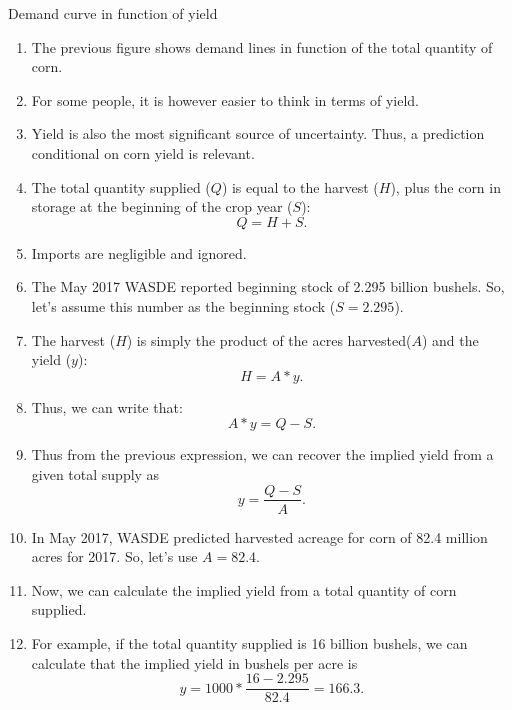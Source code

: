 \documentclass[table,xcolor=pdftex,dvipsnames, handout]{beamer}\usepackage[]{graphicx}\usepackage[]{color}
\begin{document}
\begin{frame}[allowframebreaks]{Demand curve in function of yield}
\begin{enumerate}[label=\textbullet]
  \item The previous figure shows demand lines in function of the total quantity of corn.
  \item For some people, it is however easier to think in terms of yield.
  \item Yield is also the most significant source of uncertainty. Thus, a prediction conditional on corn yield is relevant.
  \item The total quantity supplied ($Q$) is equal to the harvest ($H$), plus the corn in storage at the beginning of the crop year ($S$): \[ Q = H + S. \]
  \vspace{-\baselineskip}
  \item Imports are negligible and ignored.
  \item The May 2017 WASDE reported beginning stock of 2.295 billion bushels. So, let's assume this number as the beginning stock ($S=2.295$).
  \item The harvest ($H$) is simply the product of the acres harvested($A$) and the yield ($y$): \[ H = A*y.\]
  \vspace{-\baselineskip}
  \item Thus, we can write that: \[ A*y = Q - S.\]
  \vspace{-\baselineskip}
  \item Thus from the previous expression, we can recover the implied yield from a given total supply as \[ y = \frac{Q-S}{A}.\]
  \vspace{-\baselineskip}
  \item In May 2017, WASDE predicted harvested acreage for corn of 82.4 million acres for 2017. So, let's use $A=82.4$.
  \item Now, we can calculate the implied yield from a total quantity of corn supplied.
  \item For example, if the total quantity supplied is 16 billion bushels, we can calculate that the implied yield in bushels per acre is \[ y = 1000*\frac{16-2.295}{82.4} = 166.3.\]
\end{enumerate}
\end{frame}

\end{document}
